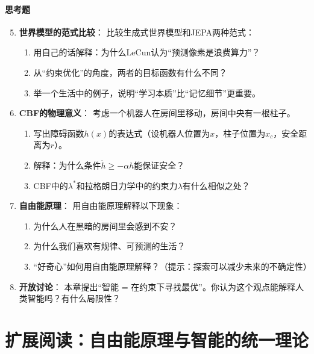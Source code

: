 \paragraph{思考题}
\begin{enumerate}
    \setcounter{enumi}{4}
    \item \textbf{世界模型的范式比较}：
    比较生成式世界模型和JEPA两种范式：
    \begin{enumerate}
        \item 用自己的话解释：为什么LeCun认为“预测像素是浪费算力”？
        \item 从“约束优化”的角度，两者的目标函数有什么不同？
        \item 举一个生活中的例子，说明“学习本质”比“记忆细节”更重要。
    \end{enumerate}
    
    \item \textbf{CBF的物理意义}：
    考虑一个机器人在房间里移动，房间中央有一根柱子。
    \begin{enumerate}
        \item 写出障碍函数$h(x)$的表达式（设机器人位置为$x$，柱子位置为$x_c$，安全距离为$r$）。
        \item 解释：为什么条件$\dot{h} \geq -\alpha h$能保证安全？
        \item CBF中的$\lambda^*$和拉格朗日力学中的约束力$\lambda$有什么相似之处？
    \end{enumerate}
    
    \item \textbf{自由能原理}：
    用自由能原理解释以下现象：
    \begin{enumerate}
        \item 为什么人在黑暗的房间里会感到不安？
        \item 为什么我们喜欢有规律、可预测的生活？
        \item “好奇心”如何用自由能原理解释？（提示：探索可以减少未来的不确定性）
    \end{enumerate}
    
    \item \textbf{开放讨论}：
    本章提出“智能 = 在约束下寻找最优”。你认为这个观点能解释人类智能吗？有什么局限性？
    
\end{enumerate}

\section*{扩展阅读：自由能原理与智能的统一理论}

